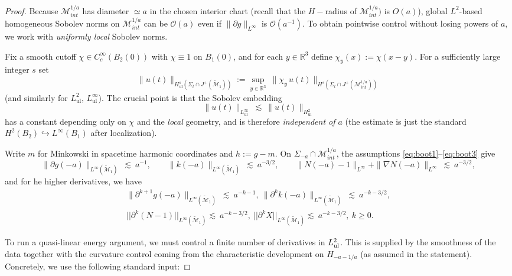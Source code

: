 \documentclass{amsart}
\begin{document}
{\begin{proof}
\noindent Because $\mathcal{M}^{1/a}_{int}$ has diameter $\simeq a$ in the chosen interior chart (recall that the $H-$radius of $\mathcal{M}^{1/a}_{int})$ is $O(a)$), global $L^2$-based homogeneous Sobolev
norms on $\mathcal{M}^{1/a}_{int}$ can be $\mathcal{O}(a)$ even if $\|\partial g\|_{L^\infty}$ is $\mathcal{O}(a^{-1})$.
To obtain pointwise control without losing powers of $a$, we work with \emph{uniformly local} Sobolev norms.

\noindent Fix a smooth cutoff $\chi\in C_c^\infty(B_2(0))$ with $\chi\equiv1$ on $B_1(0)$, and for each
$y\in\mathbb{R}^3$ define $\chi_y(x):=\chi(x-y)$. For a sufficiently large integer $s$ set
\[
\|u(t)\|_{H^s_{\mathrm{ul}}(\Sigma_t\cap J^{+}(\widetilde{\mathcal{M}}_{1}))}
:=\sup_{y\in\mathbb{R}^3}\ \|\chi_y\,u(t)\|_{H^s(\Sigma_t\cap J^{+}(\mathcal{M}^{1/a}_{int}))}
\]
(and similarly for $L^2_{\mathrm{ul}},\,L^\infty_{\mathrm{ul}}$). The crucial point is that the Sobolev embedding
\begin{equation}\label{eq:ulSobolev}
\|u(t)\|_{L^\infty_{\mathrm{ul}}}\ \lesssim\ \|u(t)\|_{H^2_{\mathrm{ul}}}
\end{equation}
has a constant depending only on $\chi$ and the \emph{local} geometry, and is therefore \emph{independent of $a$}
(the estimate is just the standard $H^2(B_2)\hookrightarrow L^\infty(B_1)$ after localization).

\medskip
\noindent Write $m$ for Minkowski in spacetime harmonic coordinates and $h:=g-m$. On $\Sigma_{-a}\cap\mathcal{M}^{1/a}_{int}$,
the assumptions \eqref{eq:boot1}--\eqref{eq:boot3} give
\begin{equation}\label{eq:initLinfty}
\|\partial g(-a)\|_{L^\infty(\widetilde{\mathcal{M}}_{1})}\ \lesssim\ a^{-1},
\qquad
\|k(-a)\|_{L^\infty(\widetilde{\mathcal{M}}_{1})}\ \lesssim\ a^{-3/2},
\qquad
\|N(-a)-1\|_{L^\infty}+\|\nabla N(-a)\|_{L^\infty}\ \lesssim\ a^{-3/2},
\end{equation}
and for he higher derivatives, we have 
\begin{align}
 \|\partial^{k+1} g(-a)\|_{L^\infty(\widetilde{\mathcal{M}}_{1})}\ \lesssim\ a^{-k-1},~
\|\partial^{k}k(-a)\|_{L^\infty(\widetilde{\mathcal{M}}_{1})}\ \lesssim\ a^{-k-3/2},\\\nonumber
||\partial^{k}(N-1)||_{L^{\infty}(\widetilde{\mathcal{M}}_{1})} \lesssim\ a^{-k-3/2},~ ||\partial^{k}X||_{L^{\infty}(\widetilde{\mathcal{M}}_{1})} \lesssim\ a^{-k-3/2},~k\geq 0. 
\end{align}

\noindent To run a quasi-linear energy argument, we must control a finite number of derivatives in $L^2_{\rm ul}$.
This is supplied by the smoothness of the data together with the curvature control coming from the characteristic
development on $H_{-a-1/a}$ (as assumed in the statement). Concretely, we use the following standard input:


\end{proof}}
\end{document}
